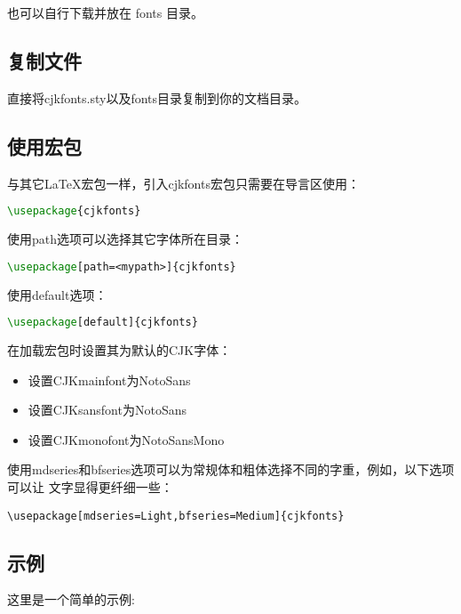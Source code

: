 \documentclass[oneside,final]{article}
\begin{document}
也可以自行下载并放在 fonts 目录。

\subsection{复制文件}

直接将cjkfonts.sty以及fonts目录复制到你的文档目录。

\subsection{使用宏包}

与其它\LaTeX{}宏包一样，引入cjkfonts宏包只需要在导言区使用：

\begin{lstlisting}[language=TeX]
\usepackage{cjkfonts}
\end{lstlisting}

使用path选项可以选择其它字体所在目录：

\begin{lstlisting}[language=TeX]
\usepackage[path=<mypath>]{cjkfonts}
\end{lstlisting}

使用default选项：

\begin{lstlisting}[language=TeX]
\usepackage[default]{cjkfonts}
\end{lstlisting}

在加载宏包时设置其为默认的CJK字体：

\begin{itemize}
\item 设置CJKmainfont为NotoSans
\item 设置CJKsansfont为NotoSans
\item 设置CJKmonofont为NotoSansMono
\end{itemize}

使用mdseries和bfseries选项可以为常规体和粗体选择不同的字重，例如，以下选项可以让
文字显得更纤细一些：

\begin{lstlisting}
\usepackage[mdseries=Light,bfseries=Medium]{cjkfonts}
\end{lstlisting}

\subsection{示例}

这里是一个简单的示例:
\end{document}
